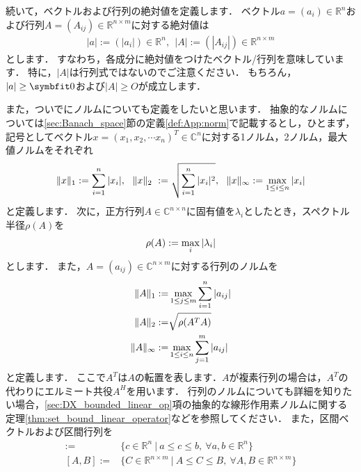 続いて，ベクトルおよび行列の絶対値を定義します．
ベクトル$a = (a_i) \in {\mathbb R}^n$および行列$A = (A_{ij}) \in {\mathbb R}^{n \times m}$に対する絶対値は
\begin{align*}
	| a | := ( | a_i | ) \in {\mathbb R}^{n} , ~~ | A | := ( | A_{ij} | ) \in {\mathbb R}^{n \times m}
\end{align*}
とします．
すなわち，各成分に絶対値をつけたベクトル/行列を意味しています．
特に，$|A|$は行列式ではないのでご注意ください．
もちろん，$| a | \ge \vector{0}$および$| A | \ge O$が成立します．


また，ついでにノルムについても定義をしたいと思います．
抽象的なノルムについては\ref{sec:Banach_space}節の定義\ref{def:App:norm}で記載するとし，ひとまず，記号としてベクトル$x = (x_1, x_2, \cdots x_n)^T \in {\mathbb C}^n$に対する1ノルム，2ノルム，最大値ノルムをそれぞれ
\begin{align*}
	\|x\|_{1} :=  \sum_{i = 1}^n |x_i |, ~~
	\|x\|_{2}\ :=  \sqrt{ \sum_{i = 1}^n |x_i|^2 }, ~~
	\|x\|_{\infty} :=  \mathop{\mathrm{max}}_{1\leq i \leq n} |x_i| 
\end{align*}
と定義します．
次に，正方行列$A \in {\mathbb C}^{n \times n}$に固有値を$\lambda_i$としたとき，スペクトル半径$\rho(A)$を
\begin{align*}
	\rho(A) := \mathop{\mathrm{max}}_{i} | \lambda_i |
\end{align*}
とします．
また，$A = (a_{ij}) \in {\mathbb C}^{n \times m}$に対する行列のノルムを
\begin{align*}
	\|A\|_{1} :=& \mathop{\mathrm{max}}_{1\leq j \leq m}\sum_{i=1}^n|a_{ij}| \\
	\|A\|_{2} :=& \sqrt{ \rho(A^T A) } \\
	\|A\|_{\infty} :=& \mathop{\mathrm{max}}_{1\leq i \leq n}\sum_{j=1}^m|a_{ij}|
\end{align*}
と定義します．
ここで$A^T$は$A$の転置を表します．$A$が複素行列の場合は，$A^T$の代わりにエルミート共役$A^H$を用います．
行列のノルムについても詳細を知りたい場合，\ref{sec:DX_bounded_linear_op}項の抽象的な線形作用素ノルムに関する定理\ref{thm:set_bound_linear_operator}などを参照してください．
また，区間ベクトルおよび区間行列を
\begin{align*}
	[a, b] :=& \{ c \in {\mathbb R}^n ~ | ~ a \le c \le b, ~ \forall a, b \in {\mathbb R}^n \} \\
	[A, B] :=& \{ C \in {\mathbb R}^{n \times m} ~ | ~ A \le C \le B, ~ \forall A, B \in {\mathbb R}^{n \times m} \}
\end{align*}
